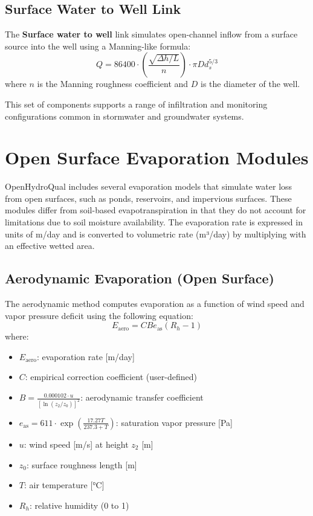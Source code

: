 \documentclass[12pt]{report}
\begin{document}
\section{Surface Water to Well Link}
The \textbf{Surface water to well} link simulates open-channel inflow from a surface source into the well using a Manning-like formula:
\begin{equation}
Q = 86400 \cdot \left( \frac{\sqrt{\Delta h / L}}{n} \right) \cdot \pi D d_s^{5/3}
\end{equation}
where $n$ is the Manning roughness coefficient and $D$ is the diameter of the well.

This set of components supports a range of infiltration and monitoring configurations common in stormwater and groundwater systems.

\chapter{Open Surface Evaporation Modules}

OpenHydroQual includes several evaporation models that simulate water loss from open surfaces, such as ponds, reservoirs, and impervious surfaces. These modules differ from soil-based evapotranspiration in that they do not account for limitations due to soil moisture availability. The evaporation rate is expressed in units of m/day and is converted to volumetric rate (m³/day) by multiplying with an effective wetted area.

\section{Aerodynamic Evaporation (Open Surface)}

The aerodynamic method computes evaporation as a function of wind speed and vapor pressure deficit using the following equation:
\begin{equation}
E_{\text{aero}} = C B e_{\text{as}} (R_h - 1)
\end{equation}
where:
\begin{itemize}
\item $E_{\text{aero}}$: evaporation rate [m/day]
\item $C$: empirical correction coefficient (user-defined)
\item $B = \frac{0.000102 \cdot u}{\left[\ln(z_2/z_0)\right]^2}$: aerodynamic transfer coefficient
\item $e_{\text{as}} = 611 \cdot \exp\left(\frac{17.27 T}{237.3 + T}\right)$: saturation vapor pressure [Pa]
\item $u$: wind speed [m/s] at height $z_2$ [m]
\item $z_0$: surface roughness length [m]
\item $T$: air temperature [°C]
\item $R_h$: relative humidity (0 to 1)
\end{itemize}
\end{document}
